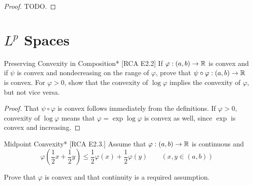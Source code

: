 \begin{proof}
    TODO. 
\end{proof}







\newpage
\section{\(L^p\) Spaces}


\begin{problem}{Preserving Convexity in Composition}*
    [RCA E2.2] If \(\varphi : (a, b) \to \mathbb{R}\) is convex and if \(\psi\) is convex and nondecreasing on the range of \(\varphi\), prove that \(\psi \circ \varphi : (a, b) \to \mathbb{R}\) is convex. For \(\varphi > 0\), show that the convexity of \(\log\varphi\) implies the convexity of \(\varphi\), but not vice versa. 
\end{problem}

\begin{proof}
    That \(\psi \circ \varphi\) is convex follows immediately from the definitions. If \(\varphi > 0\), convexity of \(\log\varphi\) means that \(\varphi = \exp \log \varphi\) is convex as well, since \(\exp\) is convex and increasing. 
\end{proof}


\begin{problem}{Midpoint Convexity}*
    [RCA E2.3.] Assume that \(\varphi: (a, b) \to \mathbb{R}\) is continuous and 
    \[
        \varphi \left(\frac{1}{2}x + \frac{1}{2}y\right) \leq \frac{1}{2} \varphi(x) + \frac{1}{2}\varphi(y)
        \qquad (x, y \in (a, b))
    \]

    Prove that \(\varphi\) is convex and that continuity is a required assumption. 
\end{problem}

